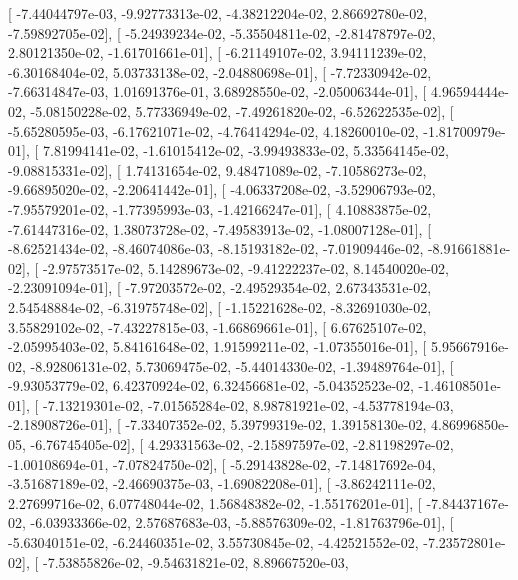 \documentclass{article}
\begin{document}
       [ -7.44044797e-03,  -9.92773313e-02,  -4.38212204e-02,
          2.86692780e-02,  -7.59892705e-02],
       [ -5.24939234e-02,  -5.35504811e-02,  -2.81478797e-02,
          2.80121350e-02,  -1.61701661e-01],
       [ -6.21149107e-02,   3.94111239e-02,  -6.30168404e-02,
          5.03733138e-02,  -2.04880698e-01],
       [ -7.72330942e-02,  -7.66314847e-03,   1.01691376e-01,
          3.68928550e-02,  -2.05006344e-01],
       [  4.96594444e-02,  -5.08150228e-02,   5.77336949e-02,
         -7.49261820e-02,  -6.52622535e-02],
       [ -5.65280595e-03,  -6.17621071e-02,  -4.76414294e-02,
          4.18260010e-02,  -1.81700979e-01],
       [  7.81994141e-02,  -1.61015412e-02,  -3.99493833e-02,
          5.33564145e-02,  -9.08815331e-02],
       [  1.74131654e-02,   9.48471089e-02,  -7.10586273e-02,
         -9.66895020e-02,  -2.20641442e-01],
       [ -4.06337208e-02,  -3.52906793e-02,  -7.95579201e-02,
         -1.77395993e-03,  -1.42166247e-01],
       [  4.10883875e-02,  -7.61447316e-02,   1.38073728e-02,
         -7.49583913e-02,  -1.08007128e-01],
       [ -8.62521434e-02,  -8.46074086e-03,  -8.15193182e-02,
         -7.01909446e-02,  -8.91661881e-02],
       [ -2.97573517e-02,   5.14289673e-02,  -9.41222237e-02,
          8.14540020e-02,  -2.23091094e-01],
       [ -7.97203572e-02,  -2.49529354e-02,   2.67343531e-02,
          2.54548884e-02,  -6.31975748e-02],
       [ -1.15221628e-02,  -8.32691030e-02,   3.55829102e-02,
         -7.43227815e-03,  -1.66869661e-01],
       [  6.67625107e-02,  -2.05995403e-02,   5.84161648e-02,
          1.91599211e-02,  -1.07355016e-01],
       [  5.95667916e-02,  -8.92806131e-02,   5.73069475e-02,
         -5.44014330e-02,  -1.39489764e-01],
       [ -9.93053779e-02,   6.42370924e-02,   6.32456681e-02,
         -5.04352523e-02,  -1.46108501e-01],
       [ -7.13219301e-02,  -7.01565284e-02,   8.98781921e-02,
         -4.53778194e-03,  -2.18908726e-01],
       [ -7.33407352e-02,   5.39799319e-02,   1.39158130e-02,
          4.86996850e-05,  -6.76745405e-02],
       [  4.29331563e-02,  -2.15897597e-02,  -2.81198297e-02,
         -1.00108694e-01,  -7.07824750e-02],
       [ -5.29143828e-02,  -7.14817692e-04,  -3.51687189e-02,
         -2.46690375e-03,  -1.69082208e-01],
       [ -3.86242111e-02,   2.27699716e-02,   6.07748044e-02,
          1.56848382e-02,  -1.55176201e-01],
       [ -7.84437167e-02,  -6.03933366e-02,   2.57687683e-03,
         -5.88576309e-02,  -1.81763796e-01],
       [ -5.63040151e-02,  -6.24460351e-02,   3.55730845e-02,
         -4.42521552e-02,  -7.23572801e-02],
       [ -7.53855826e-02,  -9.54631821e-02,   8.89667520e-03,
\end{document}
